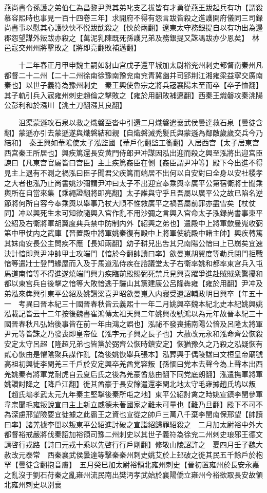 燕尚書令孫護之弟伯仁為昌黎尹與其弟叱支乙拔皆有才勇從燕王跋起兵有功【謂殺慕容熙時也事見一百十四卷三年】求開府不得有怨言跋皆殺之進護開府儀同三司録尚書事以慰其心護怏怏不悦跋酖殺之【怏於兩翻】遼東太守務銀提自以有功出為邊郡怨望謀外叛跋亦殺之【萬泥乳陳既死孫護兄弟及務銀提又誅馮跋亦少恩矣】　林邑寇交州州將擊敗之【將即亮翻敗補邁翻】

　　十二年春正月甲申魏主嗣如豺山宫戊子還平城加太尉裕兖州刺史都督南秦州凡都督二十二州【二十二州徐南徐豫南豫兖南兖青冀幽并司郢荆江湘雍梁益寧交廣南秦也】以世子義符為豫州刺史　秦王興使魯宗之將兵宼襄陽未至而卒【卒子恤翻】其子軌引兵入宼雍州刺史趙倫之擊敗之【雍於用翻敗補邁翻】西秦王熾磐攻秦洮陽公彭利和於漒川【洮土刀翻漒其良翻】

　　沮渠蒙遜攻石泉以救之熾磐至沓中引還二月熾磐遣襄武侯曇達救石泉【曇徒含翻】蒙遜亦引去蒙遜遂與熾磐結和親【自熾磐滅秃髪氏與蒙遜為鄰敵歲歲交兵今乃結和】　秦王興如華隂使太子泓監國【華戶化翻監工銜翻】入居西宫【太子居東宫西宫秦王所居也】興疾篤還長安黄門侍郎尹冲謀因泓出迎而殺之興至泓將出迎宫臣諫曰【凡東宫官屬皆曰宫臣】主上疾篤姦臣在側【姦臣謂尹冲等】殿下今出進不得見主上退有不測之禍泓曰臣子聞君父疾篤而端居不出何以自安對曰全身以安社稷孝之大者也泓乃止尚書姚沙彌謂尹冲曰太子不出迎宜奉乘輿幸廣平公第宿衛將士聞乘輿所在自當來集【乘繩證翻將即亮翻】太子誰與守乎且吾屬以廣平公之故已陷名逆節將何所自容今奉乘輿以舉事乃杖大順不惟救廣平之禍吾屬前罪亦盡雪矣【杖仗同】冲以興死生未可知欲隨興入宫作亂不用沙彌之言興入宫命太子泓録尚書事東平公紹及右衛將軍胡翼度典兵禁中防制内外【紹興之弟也】遣殿中上將軍歛曼嵬收弼第中甲仗内之武庫【晉置殿中將軍姚秦復有殿中上將軍使統殿中諸主帥】興疾轉篤其妹南安長公主問疾不應【長知兩翻】幼子耕兒出吿其兄南陽公愔曰上已崩矣宜速決計愔即與尹冲帥甲士攻端門【愔於今翻帥讀曰率】歛曼嵬胡翼度等勒兵閉門拒戰愔等遣壯士登門緣屋而入及于馬道泓侍疾在諮議堂太子右衛率姚和都率東宫兵入屯馬道南愔等不得進遂燒端門興力疾臨前殿賜弼死禁兵見興喜躍爭進赴賊賊衆驚擾和都以東宫兵自後擊之愔等大敗愔逃于驪山其黨建康公呂隆犇雍【雍於用翻】尹冲及弟泓來犇興引東平公紹及姚讚梁喜尹昭歛曼嵬入内寢受遺詔輔政明日興卒【年五十一　考異曰晉本紀三十國晉春秋皆云義熙十一年二月姚興卒魏本紀北史本紀姚興姚泓載記皆云十二年按後魏書崔鴻傳太祖天興二年姚興改號鴻以為元年故晉本紀三十國晉春秋凡弘始後事皆在前一年由鴻之誤也】泓祕不發喪捕南陽公愔及呂隆太將軍尹元等皆誅之乃發喪即皇帝位【泓字元子興之長子也】大赦改元永和泓命齊公恢殺安定太守呂超【隆超兄弟也皆黨於弼齊公恢時鎮安定】恢猶豫久之乃殺之泓疑恢有貳心恢由是懼隂聚兵謀作亂【為後姚恢舉兵張本】泓葬興于偶陵諡曰文桓皇帝廟號高祖初興徙李閏羌三千戶於安定興卒羌酋党容叛【孫愐曰党本去聲今為上聲本出西羌姚秦有將軍党耐虎自云夏后氏之後為羌豪酋慈由翻下同党底朗翻】泓遣撫軍將軍姚讚討降之【降戶江翻】徙其酋豪于長安餘遣還李閏北地太守毛雍據趙氏塢以叛【趙氏塢孝武太元九年秦主堅撃後秦所屯之地】東平公紹討禽之時姚宣鎮李閏參軍韋宗聞毛雍叛說宣曰主上新立威德未著國家之難未可量也【難乃旦翻】殿下不可不為深慮邢望險要宜徙據之此霸王之資也宣從之帥戶三萬八千棄李閏南保邢望【帥讀曰率】諸羌據李閏以叛東平公紹進討破之宣詣紹歸罪紹殺之　二月加太尉裕中外大都督裕戒嚴將伐秦詔加裕領司豫二州刺史以其世子義符為徐兖二州刺史琅邪王德文請啓行戎路【詩曰元戎十乘以先啓行行戶剛翻】修敬山陵詔許之　夏四月壬子魏大赦改元泰常　西秦襄武侯曇達等擊秦秦州刺史姚艾於上邽破之徙其民五千餘戶於枹罕【曇徒含翻抱音膚】　五月癸巳加太尉裕領北雍州刺史【晉初置雍州於長安永嘉之亂沒于劉石苻秦之亂雍州流民南出樊沔孝武始於襄陽僑立雍州今裕欲取長安故領北雍州刺史以别襄